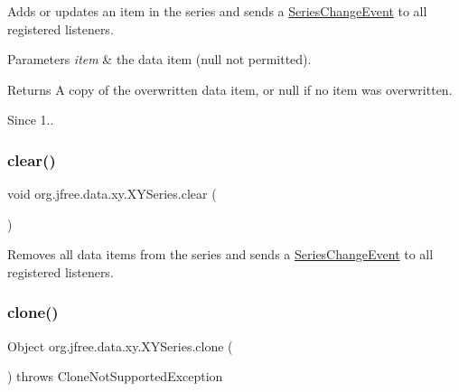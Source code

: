 Adds or updates an item in the series and sends a \mbox{\hyperlink{}{Series\+Change\+Event}} to all registered listeners.


\begin{DoxyParams}{Parameters}
{\em item} & the data item ({\ttfamily null} not permitted).\\
\hline
\end{DoxyParams}
\begin{DoxyReturn}{Returns}
A copy of the overwritten data item, or {\ttfamily null} if no item was overwritten.
\end{DoxyReturn}
\begin{DoxySince}{Since}
1.. 
\end{DoxySince}
\mbox{\label{classorg_1_1jfree_1_1data_1_1xy_1_1_x_y_series_ab044beb6d6547ebe2e15072b7d6e0df3}} 
\subsubsection{\texorpdfstring{clear()}{clear()}}
{\footnotesize\ttfamily void org.\+jfree.\+data.\+xy.\+X\+Y\+Series.\+clear (\begin{DoxyParamCaption}{ }\end{DoxyParamCaption})}

Removes all data items from the series and sends a \mbox{\hyperlink{}{Series\+Change\+Event}} to all registered listeners. \mbox{\label{classorg_1_1jfree_1_1data_1_1xy_1_1_x_y_series_a1459f456863264713ab4f722d0f5fc62}} 
\subsubsection{\texorpdfstring{clone()}{clone()}}
{\footnotesize\ttfamily Object org.\+jfree.\+data.\+xy.\+X\+Y\+Series.\+clone (\begin{DoxyParamCaption}{ }\end{DoxyParamCaption}) throws Clone\+Not\+Supported\+Exception}

